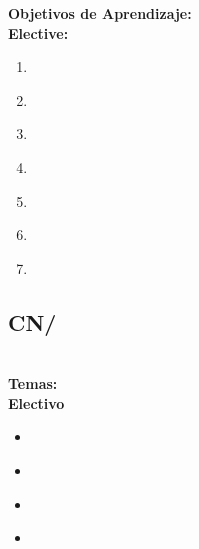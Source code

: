 \noindent \textbf{Objetivos de Aprendizaje:}\\
\noindent \textbf{Elective:}
\begin{enumerate}
	\setcounter{enumi}{0}
	\item \CNDataInformationandKnowledgeLOIdentifyAll\xspace[\CNDataInformationandKnowledgeLOIdentifyAllLevel]\label{sec:BOK:CNDataInformationandKnowledgeLOIdentifyAll}
	\item \CNDataInformationandKnowledgeLODescribeHowData\xspace[\CNDataInformationandKnowledgeLODescribeHowDataLevel]\label{sec:BOK:CNDataInformationandKnowledgeLODescribeHowData}
	\item \CNDataInformationandKnowledgeLODescribeTypical\xspace[\CNDataInformationandKnowledgeLODescribeTypicalLevel]\label{sec:BOK:CNDataInformationandKnowledgeLODescribeTypical}
	\item \CNDataInformationandKnowledgeLOSelectA\xspace[\CNDataInformationandKnowledgeLOSelectALevel]\label{sec:BOK:CNDataInformationandKnowledgeLOSelectA}
	\item \CNDataInformationandKnowledgeLOListAnd\xspace[\CNDataInformationandKnowledgeLOListAndLevel]\label{sec:BOK:CNDataInformationandKnowledgeLOListAnd}
	\item \CNDataInformationandKnowledgeLOCompareAndManagement\xspace[\CNDataInformationandKnowledgeLOCompareAndManagementLevel]\label{sec:BOK:CNDataInformationandKnowledgeLOCompareAndManagement}
	\item \CNDataInformationandKnowledgeLODesignAFor\xspace[\CNDataInformationandKnowledgeLODesignAForLevel]\label{sec:BOK:CNDataInformationandKnowledgeLODesignAFor}
\end{enumerate}

\subsection{CN/\CNNumericalAnalysis}\label{sec:BOK:CNNumericalAnalysis}
\CNNumericalAnalysisDescription\\
\noindent \textbf{Temas:}\\
\noindent \textbf{Electivo}
\begin{itemize}
	\item \CNNumericalAnalysisTopicError\label{sec:BOK:CNNumericalAnalysisTopicError}
	\item \CNNumericalAnalysisTopicFunction\label{sec:BOK:CNNumericalAnalysisTopicFunction}
	\item \CNNumericalAnalysisTopicNumerical\label{sec:BOK:CNNumericalAnalysisTopicNumerical}
	\item \CNNumericalAnalysisTopicDifferential\label{sec:BOK:CNNumericalAnalysisTopicDifferential}
\end{itemize}


